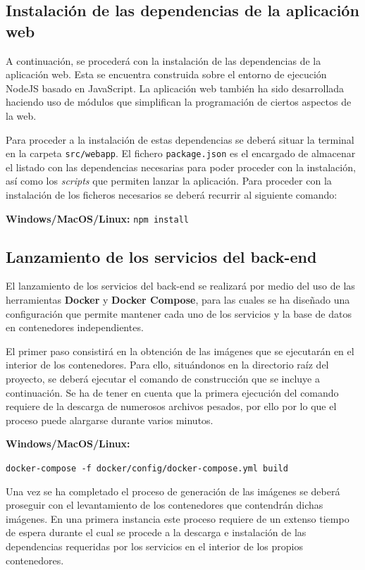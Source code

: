 \subsection{Instalación de las dependencias de la aplicación web}
A continuación, se procederá con la instalación de las dependencias de la aplicación web. Esta se encuentra construida sobre el entorno de ejecución NodeJS basado en JavaScript. La aplicación web también ha sido desarrollada haciendo uso de módulos que simplifican la programación de ciertos aspectos de la web.

Para proceder a la instalación de estas dependencias se deberá situar la terminal en la carpeta \texttt{src/webapp}. El fichero \texttt{package.json} es el encargado de almacenar el listado con las dependencias necesarias para poder proceder con la instalación, así como los \textit{scripts} que permiten lanzar la aplicación. Para proceder con la instalación de los ficheros necesarios se deberá recurrir al siguiente comando:

\vspace{0.5cm}
\centerline{\textbf{Windows/MacOS/Linux: } \texttt{npm install}}
\vspace{0.4cm}

\subsection{Lanzamiento de los servicios del back-end}

El lanzamiento de los servicios del back-end se realizará por medio del uso de las herramientas \textbf{Docker} y \textbf{Docker Compose}, para las cuales se ha diseñado una configuración que permite mantener cada uno de los servicios y la base de datos en contenedores independientes.

El primer paso consistirá en la obtención de las imágenes que se ejecutarán en el interior de los contenedores. Para ello, situándonos en la directorio raíz del proyecto, se deberá ejecutar el comando de construcción que se incluye a continuación. Se ha de tener en cuenta que la primera ejecución del comando requiere de la descarga de numerosos archivos pesados, por ello por lo que el proceso puede alargarse durante varios minutos.

\vspace{0.5cm}
\centerline{\textbf{Windows/MacOS/Linux:}}
\centerline{\texttt{docker-compose -f docker/config/docker-compose.yml build}}
\vspace{0.4cm}

Una vez se ha completado el proceso de generación de las imágenes se deberá proseguir con el levantamiento de los contenedores que contendrán dichas imágenes. En una primera instancia este proceso requiere de un extenso tiempo de espera durante el cual se procede a la descarga e instalación de las dependencias requeridas por los servicios en el interior de los propios contenedores.

